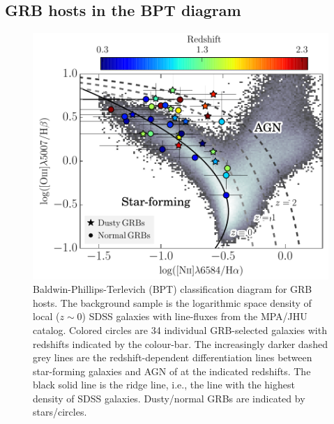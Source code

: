 \documentclass[traditabstract, longauth]{aa}
\begin{document}
\subsection{GRB hosts in the BPT diagram}

\begin{figure}
\includegraphics[angle=0, width=0.99\columnwidth]{Figs/BPT.pdf}
\caption{Baldwin-Phillips-Terlevich (BPT) classification diagram for GRB hosts. The background sample is the logarithmic space density of local ($z\sim0$) SDSS galaxies with line-fluxes from the MPA/JHU catalog\footnotemark. Colored circles are 34 individual GRB-selected galaxies with redshifts indicated by the colour-bar. The increasingly darker dashed grey lines are the redshift-dependent differentiation lines between star-forming galaxies and AGN of \citet{2013ApJ...774L..10K} at the indicated redshifts. The black solid line is the ridge line, i.e., the line with the highest density of SDSS galaxies. Dusty/normal GRBs are indicated by stars/circles.}
\label{fig:bpt}
\end{figure}
\end{document}
